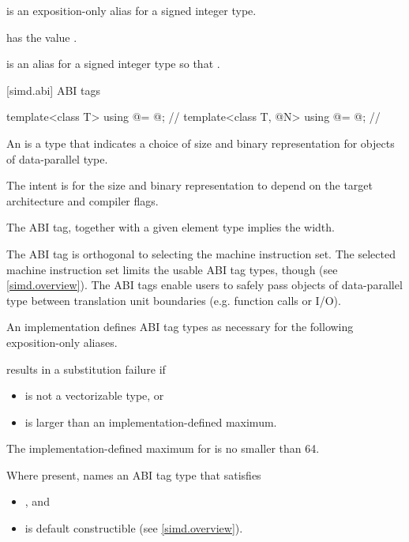 \pnum
\simdsizetype{} is an exposition-only alias for a signed integer type.

\pnum
{} has the value .

\pnum
{} is an alias for a signed integer type  so that .

[simd.abi]{ ABI tags}

\begin{codeblock}
template<class T> using @\nativeabi@ = @\seebelow@; // \expos
template<class T, @\simdsizetype@ N> using @\deducet@ = @\seebelow@; // \expos
\end{codeblock}

\pnum\label{wording.ABI.tag}
An  is a type that indicates a choice of size and binary
representation for objects of data-parallel type.
\begin{note}
  The intent is for the size and binary representation to depend on the target
  architecture and compiler flags.
\end{note}
The ABI tag, together with a given element type implies the width.

\pnum
\begin{note}
The ABI tag is orthogonal to selecting the machine instruction set.
The selected machine instruction set limits the usable ABI tag types, though
(see \ref{simd.overview}).
The ABI tags enable users to safely pass objects of data-parallel type between
translation unit boundaries (e.g. function calls or I/O).
\end{note}

\pnum
An implementation defines ABI tag types as necessary for the following
exposition-only aliases.

\pnum
{} results in a substitution failure if
\begin{itemize}
  \item {} is not a vectorizable type, or
  \item {} is larger than an implementation-defined maximum.
\end{itemize}
The implementation-defined maximum for  is no smaller than 64.

\pnum
Where present,  names an ABI tag type that satisfies
\begin{itemize}
  \item {}, and
  \item {} is default constructible (see \ref{simd.overview}).
\end{itemize}

